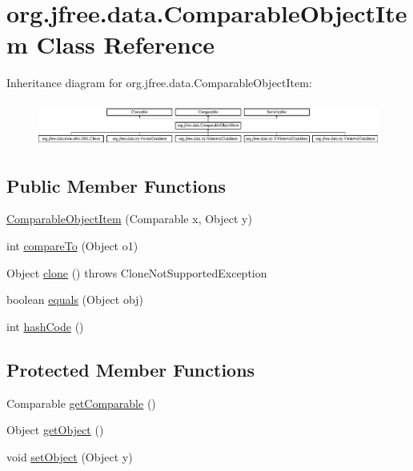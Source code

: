 \hypertarget{classorg_1_1jfree_1_1data_1_1_comparable_object_item}{}\section{org.\+jfree.\+data.\+Comparable\+Object\+Item Class Reference}
\label{classorg_1_1jfree_1_1data_1_1_comparable_object_item}
Inheritance diagram for org.\+jfree.\+data.\+Comparable\+Object\+Item\+:\begin{figure}[H]
\begin{center}
\leavevmode
\includegraphics[height=1.473684cm]{classorg_1_1jfree_1_1data_1_1_comparable_object_item}
\end{center}
\end{figure}
\subsection*{Public Member Functions}
\begin{DoxyCompactItemize}
\item 
\mbox{\hyperlink{classorg_1_1jfree_1_1data_1_1_comparable_object_item_a4103cac39a038dfb133338e37a76e47b}{Comparable\+Object\+Item}} (Comparable x, Object y)
\item 
int \mbox{\hyperlink{classorg_1_1jfree_1_1data_1_1_comparable_object_item_adea6a348292b0c15e73b004ca6f6b702}{compare\+To}} (Object o1)
\item 
Object \mbox{\hyperlink{classorg_1_1jfree_1_1data_1_1_comparable_object_item_ae850b795367b84c6857f34e39dff981d}{clone}} ()  throws Clone\+Not\+Supported\+Exception 
\item 
boolean \mbox{\hyperlink{classorg_1_1jfree_1_1data_1_1_comparable_object_item_ae227d51af55b50c7707e89a4f5d8fc38}{equals}} (Object obj)
\item 
int \mbox{\hyperlink{classorg_1_1jfree_1_1data_1_1_comparable_object_item_aafa615101ef8d32e34dd65985d44c760}{hash\+Code}} ()
\end{DoxyCompactItemize}
\subsection*{Protected Member Functions}
\begin{DoxyCompactItemize}
\item 
Comparable \mbox{\hyperlink{classorg_1_1jfree_1_1data_1_1_comparable_object_item_a556e4d2a9316c144862b0babf6a632d8}{get\+Comparable}} ()
\item 
Object \mbox{\hyperlink{classorg_1_1jfree_1_1data_1_1_comparable_object_item_a6bbc1d079e7780d0435f018e44748866}{get\+Object}} ()
\item 
void \mbox{\hyperlink{classorg_1_1jfree_1_1data_1_1_comparable_object_item_ae4a4cc9f37b0ff83deee07ff77cd5584}{set\+Object}} (Object y)
\end{DoxyCompactItemize}


